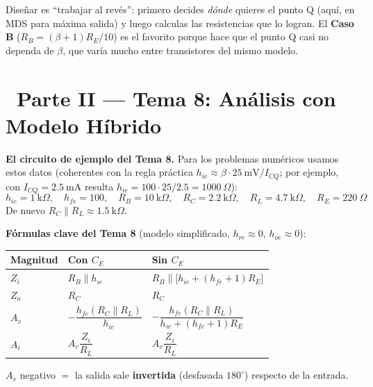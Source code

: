 \documentclass[11pt,a4paper]{article}
\newcommand{\iconotexto}[2]{\textcolor{cyanNeon}{\faIcon{#1}}~#2}
\begin{document}
\begin{porqueBox}
Diseñar es ``trabajar al revés'': primero decides \emph{dónde} quieres el punto Q (aquí, en MDS para máxima salida) y luego calculas las resistencias que lo logran. El \textbf{Caso B} ($R_B=(\beta+1)R_E/10$) es el favorito porque hace que el punto Q casi no dependa de $\beta$, que varía mucho entre transistores del mismo modelo.
\end{porqueBox}

\section{\iconotexto{project-diagram}{Parte II --- Tema 8: Análisis con Modelo Híbrido}}

\begin{cajaConcepto}
\textbf{El circuito de ejemplo del Tema 8.} Para los problemas numéricos usamos estos datos (coherentes con la regla práctica $h_{ie}\approx\beta\cdot 25\ \text{mV}/I_{CQ}$; por ejemplo, con $I_{CQ}=2.5\ \text{mA}$ resulta $h_{ie}=100\cdot 25/2.5=1000\ \Omega$):
\[
h_{ie}=1\ \text{k}\Omega,\quad h_{fe}=100,\quad R_B=10\ \text{k}\Omega,\quad R_C=2.2\ \text{k}\Omega,\quad R_L=4.7\ \text{k}\Omega,\quad R_E=220\ \Omega
\]
De nuevo $R_C\parallel R_L\approx1.5\ \text{k}\Omega$.
\end{cajaConcepto}

\begin{cajaRecuerda}
\textbf{Fórmulas clave del Tema 8} (modelo simplificado, $h_{re}\approx0$, $h_{oe}\approx0$):
\begin{center}
\begin{tabularx}{0.95\linewidth}{@{} l >{\centering\arraybackslash}X >{\centering\arraybackslash}X @{}}
\toprule
\textbf{Magnitud} & \textbf{Con $C_E$} & \textbf{Sin $C_E$} \\
\midrule
$Z_i$ & $R_B\parallel h_{ie}$ & $R_B\parallel\bigl[h_{ie}+(h_{fe}+1)R_E\bigr]$ \\
$Z_o$ & $R_C$ & $R_C$ \\
$A_v$ & $-\dfrac{h_{fe}(R_C\parallel R_L)}{h_{ie}}$ & $-\dfrac{h_{fe}(R_C\parallel R_L)}{h_{ie}+(h_{fe}+1)R_E}$ \\
$A_i$ & $A_v\dfrac{Z_i}{R_L}$ & $A_v\dfrac{Z_i}{R_L}$ \\
\bottomrule
\end{tabularx}
\end{center}
$A_v$ negativo $=$ la salida sale \textbf{invertida} (desfasada $180^\circ$) respecto de la entrada.
\end{cajaRecuerda}
\end{document}
